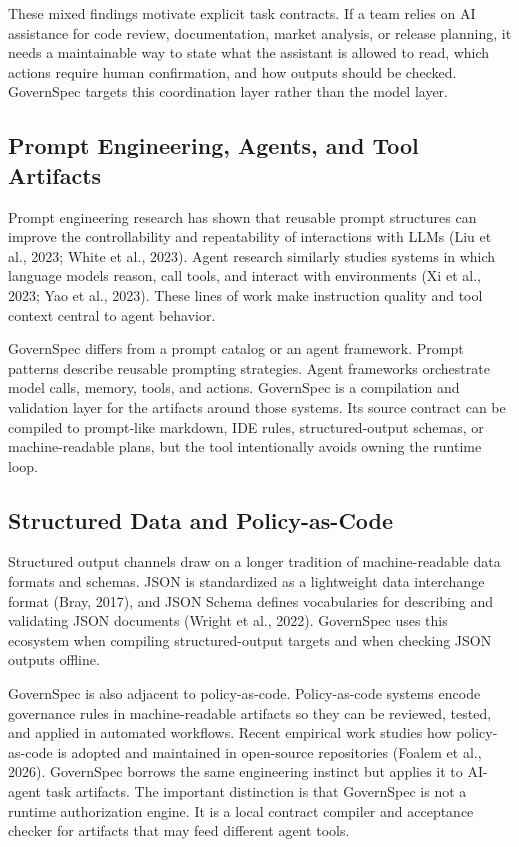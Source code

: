 \documentclass[11pt]{article}
\begin{document}
These mixed findings motivate explicit task contracts. If a team relies on AI
assistance for code review, documentation, market analysis, or release planning, it
needs a maintainable way to state what the assistant is allowed to read, which
actions require human confirmation, and how outputs should be checked. GovernSpec
targets this coordination layer rather than the model layer.

\subsection{Prompt Engineering, Agents, and Tool Artifacts}

Prompt engineering research has shown that reusable prompt structures can improve
the controllability and repeatability of interactions with LLMs (Liu et al., 2023;
White et al., 2023). Agent research similarly studies systems in which language
models reason, call tools, and interact with environments (Xi et al., 2023; Yao et
al., 2023). These lines of work make instruction quality and tool context central to
agent behavior.

GovernSpec differs from a prompt catalog or an agent framework. Prompt patterns
describe reusable prompting strategies. Agent frameworks orchestrate model calls,
memory, tools, and actions. GovernSpec is a compilation and validation layer for the
artifacts around those systems. Its source contract can be compiled to prompt-like
markdown, IDE rules, structured-output schemas, or machine-readable plans, but the
tool intentionally avoids owning the runtime loop.

\subsection{Structured Data and Policy-as-Code}

Structured output channels draw on a longer tradition of machine-readable data
formats and schemas. JSON is standardized as a lightweight data interchange format
(Bray, 2017), and JSON Schema defines vocabularies for describing and validating
JSON documents (Wright et al., 2022). GovernSpec uses this ecosystem when compiling
structured-output targets and when checking JSON outputs offline.

GovernSpec is also adjacent to policy-as-code. Policy-as-code systems encode
governance rules in machine-readable artifacts so they can be reviewed, tested, and
applied in automated workflows. Recent empirical work studies how policy-as-code is
adopted and maintained in open-source repositories (Foalem et al., 2026). GovernSpec
borrows the same engineering instinct but applies it to AI-agent task artifacts. The
important distinction is that GovernSpec is not a runtime authorization engine. It
is a local contract compiler and acceptance checker for artifacts that may feed
different agent tools.
\end{document}
